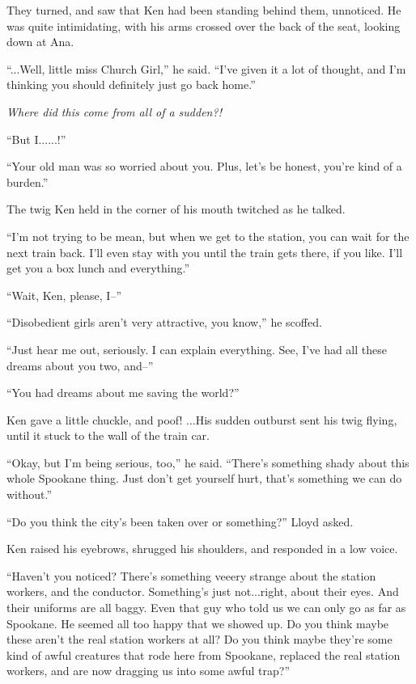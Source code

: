 \documentclass[
]{article}
\begin{document}
They turned, and saw that Ken had been standing behind them, unnoticed.
He was quite intimidating, with his arms crossed over the back of the
seat, looking down at Ana.

``...Well, little miss Church Girl,'' he said. ``I've given it a lot of
thought, and I'm thinking you should definitely just go back home.''

\emph{Where did this come from all of a sudden?!}

``But I......!''

``Your old man was so worried about you. Plus, let's be honest, you're
kind of a burden.''

The twig Ken held in the corner of his mouth twitched as he talked.

``I'm not trying to be mean, but when we get to the station, you can
wait for the next train back. I'll even stay with you until the train
gets there, if you like. I'll get you a box lunch and everything.''

``Wait, Ken, please, I--''

``Disobedient girls aren't very attractive, you know,'' he scoffed.

``Just hear me out, seriously. I can explain everything. See, I've had
all these dreams about you two, and--''

``You had dreams about me saving the world?''

Ken gave a little chuckle, and poof! ...His sudden outburst sent his
twig flying, until it stuck to the wall of the train car.

``Okay, but I'm being serious, too,'' he said. ``There's something shady
about this whole Spookane thing. Just don't get yourself hurt, that's
something we can do without.''

``Do you think the city's been taken over or something?'' Lloyd asked.

Ken raised his eyebrows, shrugged his shoulders, and responded in a low
voice.

``Haven't you noticed? There's something veeery strange about the
station workers, and the conductor. Something's just not...right, about
their eyes. And their uniforms are all baggy. Even that guy who told us
we can only go as far as Spookane. He seemed all too happy that we
showed up. Do you think maybe these aren't the real station workers at
all? Do you think maybe they're some kind of awful creatures that rode
here from Spookane, replaced the real station workers, and are now
dragging us into some awful trap?''
\end{document}
